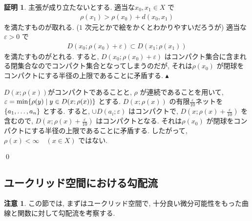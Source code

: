 \documentclass[10pt, fleqn, label-section=none]{bxjsarticle}
\theoremstyle{definition}
\newtheorem*{pf*}{証明}
\newtheorem{remark}[dfn]{注意}
\newcommand{\veps}{\varepsilon}
\newcommand{\cbra}[1]{\mleft\{#1\mright\}}
\newcommand{\abs}[1]{\left|#1\right|}
\renewcommand{\;}{\, ; \,}
\newenvironment{claim}[1]{\par\noindent\underline{step:}\space#1}{}
\newenvironment{claimproof}[1]{\par\noindent{($\because$)}\space#1}{\hfill $\blacktriangle $}
\begin{document}
\begin{pf*}
\begin{claimproof}
主張が成り立たないとする. 適当な$x_0, x_1 \in X $ で
\begin{align*}  \rho(x_1)  >  \rho(x_0 )   + d(x_0 , x_1)   \end{align*}
を満たすものが取れる. ($1$ 次元とかで絵をかくとわかりやすいだろうが) 適当な$\veps > 0$ で
\begin{align*} D(x_0; \rho(x_0) + \veps) \subset D(x_1; \rho (x_1))  \end{align*}
を満たすものがとれる. すると, $D(x_0; \rho(x_0) + \veps) $ はコンパクト集合に含まれる閉集合なのでコンパクト集合となってしまうのだが, それは$\rho (x_0)$ が閉球をコンパクトにする半径の上限であることに矛盾する. 
\end{claimproof}

$D(x; \rho(x)) $がコンパクトであることと, $\rho$ が連続であることを用いて, $\veps = \min \cbra{\rho (y) \mid y \in D(x; \rho(x)) }$ とする. $D(x; \rho(x)) $ の有限$\frac{\veps}{10}$ネットを$\cbra{a_1, \ldots , a_n}$ とする. すると, $\cup D(a_i; \veps)$ はコンパクトで, $D(x; \rho(x) + \frac{\veps}{10}) $ を含むので, $D(x; \rho(x) + \frac{\veps}{10}) $ はコンパクトとなる. それは$\rho (x_0)$ が閉球をコンパクトにする半径の上限であることに矛盾する. したがって, $\rho(x) < \infty \quad(x \in X)$ ではない. 

\qed
\end{pf*}




\subsection{ユークリッド空間における勾配流}

\begin{remark}
この節では, まずはユークリッド空間で, 十分良い微分可能性をもった曲線と関数に対して勾配流を考察する. 
\end{remark}
\end{document}
